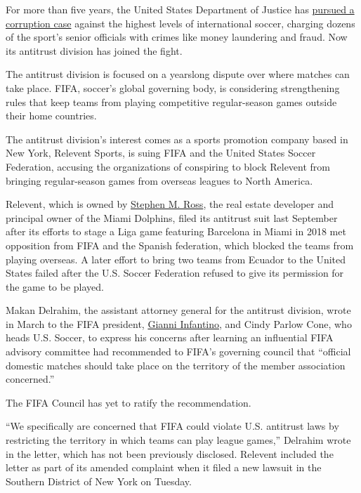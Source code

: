For more than five years, the United States Department of Justice has
\href{https://www.nytimes3xbfgragh.onion/2015/12/03/sports/fifa-scandal-arrests-in-switzerland.html}{pursued
a corruption case} against the highest levels of international soccer,
charging dozens of the sport's senior officials with crimes like money
laundering and fraud. Now its antitrust division has joined the fight.

The antitrust division is focused on a yearslong dispute over where
matches can take place. FIFA, soccer's global governing body, is
considering strengthening rules that keep teams from playing competitive
regular-season games outside their home countries.

The antitrust division's interest comes as a sports promotion company
based in New York, Relevent Sports, is suing FIFA and the United States
Soccer Federation, accusing the organizations of conspiring to block
Relevent from bringing regular-season games from overseas leagues to
North America.

Relevent, which is owned by
\href{https://www.nytimes3xbfgragh.onion/2020/01/21/sports/soccer/icc-stephen-ross-summer-tour.html}{Stephen
M. Ross}, the real estate developer and principal owner of the Miami
Dolphins, filed its antitrust suit last September after its efforts to
stage a Liga game featuring Barcelona in Miami in 2018 met opposition
from FIFA and the Spanish federation, which blocked the teams from
playing overseas. A later effort to bring two teams from Ecuador to the
United States failed after the U.S. Soccer Federation refused to give
its permission for the game to be played.

Makan Delrahim, the assistant attorney general for the antitrust
division, wrote in March to the FIFA president,
\href{https://www.nytimes3xbfgragh.onion/2018/06/10/sports/gianni-infantino-fifa.html}{Gianni
Infantino}, and Cindy Parlow Cone, who heads U.S. Soccer, to express his
concerns after learning an influential FIFA advisory committee had
recommended to FIFA's governing council that ``official domestic matches
should take place on the territory of the member association
concerned.''

The FIFA Council has yet to ratify the recommendation.

``We specifically are concerned that FIFA could violate U.S. antitrust
laws by restricting the territory in which teams can play league
games,'' Delrahim wrote in the letter, which has not been previously
disclosed. Relevent included the letter as part of its amended complaint
when it filed a new lawsuit in the Southern District of New York on
Tuesday.

